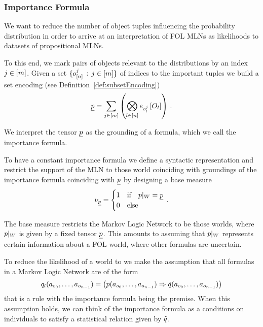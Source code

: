 	
	
\subsubsection{Importance Formula}


We want to reduce the number of object tuples influencing the probability distribution in order to arrive at an interpretation of FOL MLNs as likelihoods to datasets of propositional MLNs.

To this end, we mark pairs of objects relevant to the distributions by an index $j\in[m]$.
Given a set $\{o_{[n]}^{j} \, : \, j\in[m] \}$ of indices to the important tuples we build a set encoding (see Definition~\ref{def:subsetEncoding})
\begin{align*}
	\underline{p} = \sum_{j\in[m]} \left(
		 \bigotimes_{l\in[n]} e_{o_{l}^{j}}\left[O_{l}\right] 
	 \right) \, . 
\end{align*}

We interpret the tensor $\underline{p}$ as the grounding of a formula, which we call the importance formula.

To have a constant importance formula we define a syntactic representation and restrict the support of the MLN to those world coinciding with groundings of the importance formula coinciding with $\underline{p}$ by designing a base measure
\begin{align*}
	\nu_{\underline{p}}= \begin{cases}
		1 & \text{if} \quad {p}|_{W} = \underline{p} \\
		0 & \text{else}
	\end{cases} \, . 
\end{align*}

The base measure restricts the Markov Logic Network to be those worlds, where ${p}|_{W}$ is given by a fixed tensor $\underline{p}$.
This amounts to assuming that ${p}|_{W}$ represents certain information about a FOL world, where other formulas are uncertain.



To reduce the likelihood of a world to we make the assumption that all formulas in a Markov Logic Network are of the form
\begin{align}\label{eq:folImplicationForm}
	q_{l}(a_{o_{0}},\ldots,a_{o_{n-1}}) =
	\left( p(a_{o_{0}},\ldots,a_{o_{n-1}}) \Rightarrow \tilde{q}(a_{o_{0}},\ldots,a_{o_{n-1}}) \right) 
\end{align}
that is a rule with the importance formula being the premise.
When this assumption holds, we can think of the importance formula as a conditions on individuals to satisfy a statistical relation given by $\tilde{q}$.


